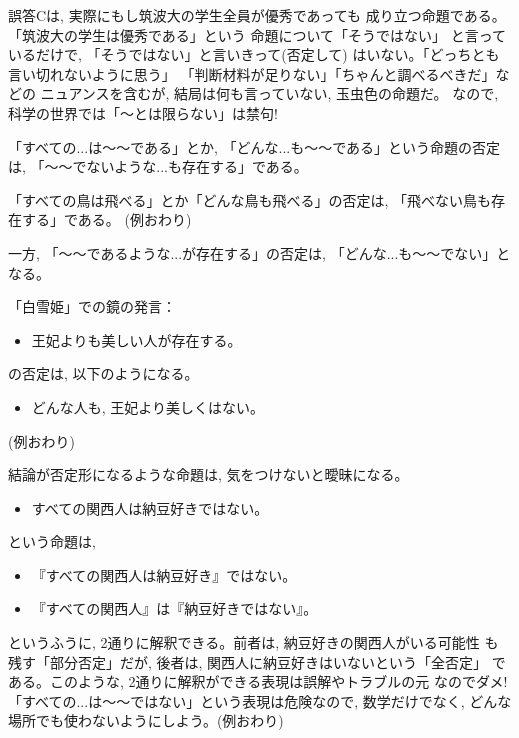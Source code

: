 誤答Cは, 実際にもし筑波大の学生全員が優秀であっても
成り立つ命題である。「筑波大の学生は優秀である」という
命題について「そうではない」
と言っているだけで, 「そうではない」と言いきって(否定して)
はいない。「どっちとも言い切れないように思う」
「判断材料が足りない」「ちゃんと調べるべきだ」などの
ニュアンスを含むが, 結局は何も言っていない, 玉虫色の命題だ。
なので, 科学の世界では「〜とは限らない」は禁句!\mv

「すべての...は〜〜である」とか, 「どんな...も〜〜である」という命題の否定は, 
「〜〜でないような...も存在する」である。\\

\begin{exmpl}
「すべての鳥は飛べる」とか「どんな鳥も飛べる」の否定は, 
「飛べない鳥も存在する」である。
(例おわり)\end{exmpl}

一方, 「〜〜であるような...が存在する」の否定は, 
「どんな...も〜〜でない」となる。
\begin{exmpl}
「白雪姫」での鏡の発言：
\begin{itemize}
\item 王妃よりも美しい人が存在する。
\end{itemize}
の否定は, 以下のようになる。
\begin{itemize}
\item どんな人も, 王妃より美しくはない。
\end{itemize}
(例おわり)\end{exmpl}
\mv

結論が否定形になるような命題は, 気をつけないと曖昧になる。

\begin{exmpl}
\begin{itemize}
\item すべての関西人は納豆好きではない。
\end{itemize}
という命題は, 
\begin{itemize}
\item 『すべての関西人は納豆好き』ではない。
\item 『すべての関西人』は『納豆好きではない』。
\end{itemize}
というふうに, 2通りに解釈できる。前者は, 納豆好きの関西人がいる可能性
も残す「部分否定」だが, 後者は, 関西人に納豆好きはいないという「全否定」
である。このような, 2通りに解釈ができる表現は誤解やトラブルの元
なのでダメ!「すべての...は〜〜ではない」という表現は危険なので, 数学だけでなく, 
どんな場所でも使わないようにしよう。(例おわり)\end{exmpl}
\mv

